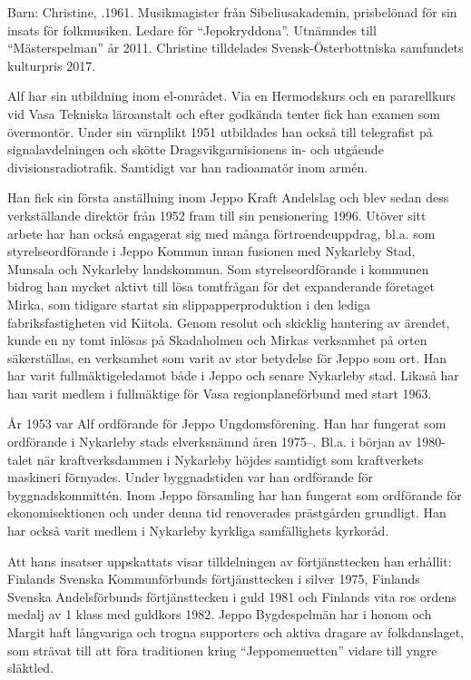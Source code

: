 Barn: Christine, .1961. Musikmagister från Sibeliusakademin, prisbelönad för sin insats för folkmusiken. Ledare för ``Jepokryddona''. Utnämndes till ``Mästerspelman'' år 2011. Christine tilldelades Svensk-Österbottniska samfundets kulturpris 2017.

Alf har sin utbildning inom el-området. Via en Hermodskurs och en pararellkurs vid Vasa Tekniska läroanstalt och efter godkända tenter fick han examen som övermontör. Under sin värnplikt 1951 utbildades han också till telegrafist på signalavdelningen och skötte Dragsvikgarnisionens in- och utgående divisionsradiotrafik. Samtidigt var han radioamatör inom armén.

Han fick sin första anställning inom Jeppo Kraft Andelslag och blev sedan dess verkställande direktör från 1952  fram till sin pensionering 1996. Utöver sitt arbete har han också engagerat sig med många förtroendeuppdrag, bl.a. som styrelseordförande i Jeppo Kommun innan fusionen med Nykarleby Stad, Munsala och Nykarleby landskommun. Som styrelseordförande i kommunen bidrog han mycket aktivt till lösa tomtfrågan för det expanderande företaget Mirka, som tidigare startat sin slippapperproduktion i den lediga fabriksfastigheten vid Kiitola. Genom resolut och skicklig hantering av ärendet, kunde en ny tomt inlösas på Skadaholmen och Mirkas verksamhet på orten säkerställas, en verksamhet som varit av stor betydelse för Jeppo som ort. Han har varit fullmäktigeledamot både i Jeppo och senare Nykarleby stad. Likaså har han varit  medlem i fullmäktige för Vasa regionplaneförbund med start 1963.

År 1953 var Alf ordförande för Jeppo Ungdomsförening. Han har fungerat som ordförande i Nykarleby stads elverksnämnd åren 1975--. Bl.a. i början av 1980-talet när kraftverksdammen i Nykarleby höjdes samtidigt som kraftverkets maskineri förnyades. Under byggnadstiden var han ordförande för byggnadskommittén. Inom Jeppo församling har han fungerat som ordförande för ekonomisektionen och under denna tid renoverades prästgården grundligt. Han har också varit medlem i Nykarleby kyrkliga samfällighets kyrkoråd.

Att hans insatser uppskattats visar tilldelningen av förtjänsttecken han erhållit: Finlands Svenska Kommunförbunds förtjänsttecken i silver 1975, Finlands Svenska Andelsförbunds förtjänsttecken i guld 1981 och Finlands vita ros ordens medalj av 1 klass med guldkors 1982. Jeppo Bygdespelmän har i honom och Margit haft långvariga och trogna supporters och aktiva dragare av folkdanslaget, som strävat till att föra traditionen kring ``Jeppomenuetten'' vidare till yngre släktled.

